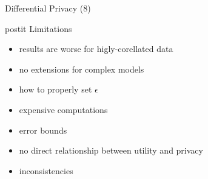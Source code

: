 \documentclass{beamer}
\begin{document}
\begin{frame}{Differential Privacy (8)}
  \begin{beamercolorbox}[wd=\textwidth,rounded=true,shadow=true]{postit}
    Limitations
  \end{beamercolorbox}
  \begin{itemize}
    \item results are worse for higly-corellated data
    \item no extensions for complex models
    \item how to properly set $\epsilon$
    \item expensive computations
    \item error bounds
    \item no direct relationship between utility and privacy
    \item inconsistencies
  \end{itemize}
\end{frame}
\end{document}
